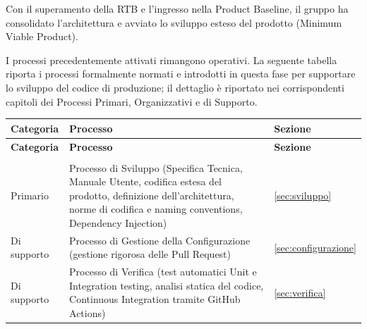 Con il superamento della RTB e l'ingresso nella Product Baseline, il gruppo ha consolidato l'architettura e avviato lo sviluppo esteso del prodotto (Minimum Viable Product).

I processi precedentemente attivati rimangono operativi. La seguente tabella riporta i processi formalmente normati e introdotti in questa fase per supportare lo sviluppo del codice di produzione; il dettaglio è riportato nei corrispondenti capitoli dei Processi Primari, Organizzativi e di Supporto.

\bigskip

\begin{xltabular}{\textwidth}{
    >{\raggedright\arraybackslash}p{3cm}
    >{\raggedright\arraybackslash}X
    >{\raggedright\arraybackslash}p{3cm}
}
    \toprule
    \textbf{Categoria} & \textbf{Processo} & \textbf{Sezione} \\
    \midrule
    \endfirsthead

    \toprule
    \textbf{Categoria} & \textbf{Processo} & \textbf{Sezione} \\
    \midrule
    \endhead

    \midrule
     \\
    \endfoot

    \bottomrule
    \endlastfoot

    Primario
    & Processo di Sviluppo (Specifica Tecnica, Manuale Utente, codifica estesa del prodotto, definizione dell'architettura, norme di codifica e naming conventions, Dependency Injection)
    & \ref{sec:sviluppo} \\

    Di supporto
    & Processo di Gestione della Configurazione (gestione rigorosa delle Pull Request)
    & \ref{sec:configurazione} \\

    Di supporto
    & Processo di Verifica (test automatici Unit e Integration testing, analisi statica del codice, Continuous Integration tramite GitHub Actions)
    & \ref{sec:verifica} \\

\end{xltabular}